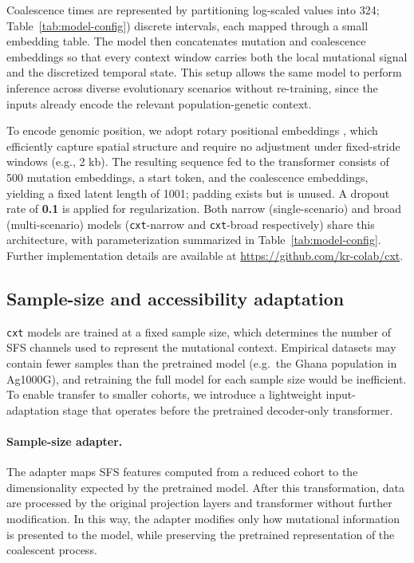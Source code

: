 \documentclass{article}
\newcommand{\cxtkit}{\texttt{cxt}\xspace}
\let\citep\parencite
\begin{document}
{Coalescence times are represented by partitioning log-scaled values into 324; 
Table~\ref{tab:model-config}) discrete intervals, each mapped through a small embedding table. 
The model then concatenates mutation and coalescence embeddings
so that every context window carries both the local mutational signal and the discretized temporal state. 
This setup allows the same model to perform inference across diverse evolutionary scenarios without re-training, 
since the inputs already encode the relevant population-genetic context.

To encode genomic position, we adopt rotary positional embeddings \citep{su_roformer_2023},
which efficiently capture spatial structure and require no adjustment under fixed-stride windows (e.g., 2 kb).
The resulting sequence fed to the transformer consists of 500 mutation embeddings, a start token, 
and the coalescence embeddings, yielding a fixed latent length of 1001; padding exists but is unused. 
A dropout rate of \textbf{0.1} is applied for regularization. 
Both narrow (single-scenario) and broad (multi-scenario) models (\cxtkit-narrow and \cxtkit-broad respectively) share this architecture, 
with parameterization summarized in Table~\ref{tab:model-config}. 
Further implementation details are available at \url{https://github.com/kr-colab/cxt}.

\subsection*{Sample-size and accessibility adaptation}
\label{sec:adapter}

\cxtkit models are trained at a fixed sample size, which determines the number of
SFS channels used to represent the mutational context.
Empirical datasets may contain fewer samples than the pretrained model
(e.g.\ the Ghana population in Ag1000G), and retraining the full model for each
sample size would be inefficient.
To enable transfer to smaller cohorts, we introduce a lightweight input-adaptation stage that operates
before the pretrained decoder-only transformer.

\paragraph{Sample-size adapter.}
The adapter maps SFS features computed from a reduced cohort to the dimensionality
expected by the pretrained model.
After this transformation, data are processed by the original projection layers
and transformer without further modification.
In this way, the adapter modifies only how mutational information is presented to
the model, while preserving the pretrained representation of the coalescent process.

}
\end{document}
